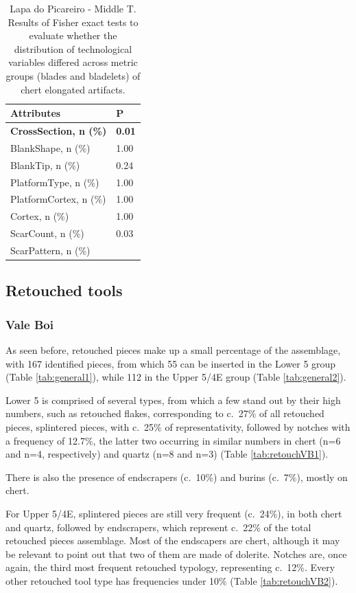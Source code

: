 \documentclass[12pt,twoside]{reedthesis}
\begin{document}
\begingroup\fontsize{9}{11}\selectfont
\begin{longtable}[t]{ll}
\caption{\label{tab:fisherelongLP2}Lapa do Picareiro - Middle T. Results of Fisher exact tests to evaluate whether the distribution of technological variables differed across metric groups (blades and bladelets) of chert elongated artifacts.}\\
\toprule
Attributes & P\\
\midrule
\textbf{CrossSection, n (\%)} & \textbf{0.01}\\
BlankShape, n (\%) & 1.00\\
BlankTip, n (\%) & 0.24\\
PlatformType, n (\%) & 1.00\\
PlatformCortex, n (\%) & 1.00\\
\addlinespace
Cortex, n (\%) & 1.00\\
ScarCount, n (\%) & 0.03\\
ScarPattern, n (\%) & \\
\bottomrule
\end{longtable}
\endgroup{}

\hypertarget{retouched-tools}{%
\subsection{Retouched tools}\label{retouched-tools}}

\hypertarget{vale-boi-7}{%
\subsubsection{Vale Boi}\label{vale-boi-7}}

As seen before, retouched pieces make up a small percentage of the assemblage, with 167 identified pieces, from which 55 can be inserted in the Lower 5 group (Table \ref{tab:general1}), while 112 in the Upper 5/4E group (Table \ref{tab:general2}).

Lower 5 is comprised of several types, from which a few stand out by their high numbers, such as retouched flakes, corresponding to c.~27\% of all retouched pieces, splintered pieces, with c.~25\% of representativity, followed by notches with a frequency of 12.7\%, the latter two occurring in similar numbers in chert (n=6 and n=4, respectively) and quartz (n=8 and n=3) (Table \ref{tab:retouchVB1}).

There is also the presence of endscrapers (c.~10\%) and burins (c.~7\%), mostly on chert.

For Upper 5/4E, splintered pieces are still very frequent (c.~24\%), in both chert and quartz, followed by endscrapers, which represent c.~22\% of the total retouched pieces assemblage. Most of the endscapers are chert, although it may be relevant to point out that two of them are made of dolerite. Notches are, once again, the third most frequent retouched typology, representing c.~12\%. Every other retouched tool type has frequencies under 10\% (Table \ref{tab:retouchVB2}).
\end{document}
